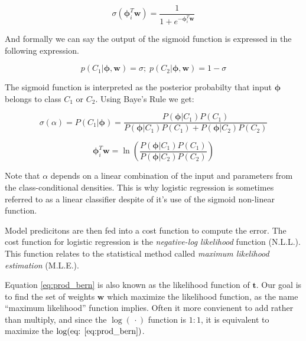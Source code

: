 \message{ !name(main.tex)}\documentclass[11pt]{article}
\begin{document}
\begin{equation}\label{eq:sigmoid}
  \sigma\left(\mathbf{\phi}_{i}^{T}\mathbf{w}\right) = \frac{1}{1+e^{-\mathbf{\phi}_{i}^{T}\mathbf{w}}}
\end{equation}

And formally we can say the output of the sigmoid function is expressed in the following expression.

\begin{equation}
p\left(C_{1}|\mathbf{\phi},\mathbf{w}\right) = \sigma;\; p\left(C_{2}|\mathbf{\phi},\mathbf{w}\right) = 1 - \sigma
\end{equation}

The sigmoid function is interpreted as the posterior probabilty that input $\mathbf{\phi}$ belongs to class $C_{1}$ or $C_{2}$. Using Baye's Rule we get:

\begin{equation}
   \sigma\left(\alpha\right) = P\left(C_{1}|\mathbf{\phi}\right) = \frac{P\left(\mathbf{\phi}|C_{1}\right)P\left(C_{1}\right)}{P\left(\mathbf{\phi}|C_{1}\right)P\left(C_{1}\right) + P\left(\mathbf{\phi}|C_{2}\right)P\left(C_{2}\right)}
\end{equation}

\begin{equation}
  \mathbf{\phi}_{i}^{T}\mathbf{w} = \ln\left(\frac{P\left(\mathbf{\phi}|C_{1}\right)P\left(C_{1}\right)}{P\left(\mathbf{\phi}|C_{2}\right)P\left(C_{2}\right)}\right)
\end{equation}


Note that $\alpha$ depends on a linear combination of the input and parameters from the class-conditional densities. This is why logistic regression is sometimes referred to as a linear classifier despite of it's use of the sigmoid non-linear function. 

Model predicitons are then fed into a cost function to compute the error. The cost function for logistic regression is the \emph{negative-log likelihood} function (N.L.L.). This function relates to the statistical method called \emph{maximum likelihood estimation} (M.L.E.).

Equation \ref{eq:prod_bern} is also known as the likelihood function of $\mathbf{t}$. Our goal is to find the set of weights $\mathbf{w}$ which maximize the likelihood function, as the name ``maximum likelihood'' function implies. Often it more convienent to add rather than multiply, and since the $\log\left(\,\cdotp\right)$ function is $1:1$, it is equivalent to maximize the $\log(\text{eq: }\ref{eq:prod_bern})$.
\end{document}
